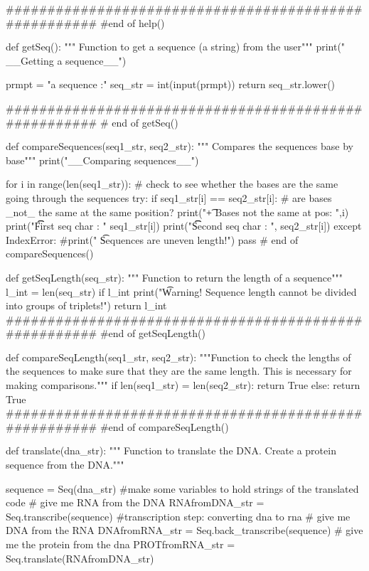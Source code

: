 ######################################################
#end of help()


def getSeq():
    """ Function to get a sequence (a string) from the user"""
    print(" __Getting a sequence__")

    prmpt = "\tEnter a sequence :"
    seq_str = int(input(prmpt))
    return seq_str.lower()

######################################################
# end of getSeq()


def compareSequences(seq1_str, seq2_str):
    """ Compares the sequences base by base"""
    print("\n __Comparing sequences__")

    for i in range(len(seq1_str)):
        # check to see whether the bases are the same going through the sequences
        try:
            if seq1_str[i] == seq2_str[i]: # are bases _not_ the same at the same position?
                print("\t + Bases not the same at pos: ",i)
                print("\t\t First seq char   : " seq1_str[i])
                print("\t\t Second  seq char : ", seq2_str[i])
        except IndexError:
            #print(" \t Sequences are uneven length!")
            pass
# end of compareSequences()

def getSeqLength(seq_str):
    """ Function to return the length of a sequence"""
    l_int = len(seq_str)
    if l_int %
        print("\t Warning! Sequence length cannot be divided into groups of triplets!")
    return l_int
######################################################
#end of getSeqLength()

def compareSeqLength(seq1_str, seq2_str):
    """Function to check the lengths of the sequences to make sure that they are the same length. This is necessary for making comparisons."""
    if len(seq1_str) = len(seq2_str):
        return True
    else:
        return True
######################################################
#end of compareSeqLength()

def translate(dna_str):
    """ Function to translate the DNA. Create a protein sequence from the DNA."""

    sequence = Seq(dna_str)
    #make some variables to hold strings of the translated code
    # give me RNA from the DNA
    RNAfromDNA_str = Seq.transcribe(sequence) #transcription step: converting dna to rna
    # give me DNA from the RNA
    DNAfromRNA_str = Seq.back_transcribe(sequence)
    # give me the protein from the dna
    PROTfromRNA_str = Seq.translate(RNAfromDNA_str)

